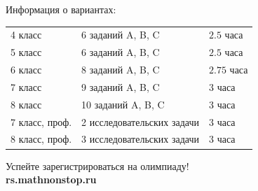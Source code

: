 \documentclass[a4paper,17pt]{extarticle}
\begin{document}
Информация о вариантах:\vspace{-6mm}
\begin{center} \begin{tabular}{lll}
	4 класс & 6 заданий A, B, C & $2.5$ часа \\
	5 класс & 6 заданий A, B, C & $2.5$ часа \\
	6 класс & 8 заданий A, B, C & $2.75$ часа \\
	7 класс & 9 заданий A, B, C & $3$ часа \\
	8 класс & 10 заданий A, B, C & $3$ часа \\
	7 класс, проф. & 2 исследовательских задачи & $3$ часа \\
	8 класс, проф. & 3 исследовательских задачи & $3$ часа \\
\end{tabular} \end{center}

\begin{center}
	Успейте зарегистрироваться на олимпиаду!\\[0.3cm]
	{\bf\large rs.mathnonstop.ru}
\end{center}

\clearpage
\end{document}

